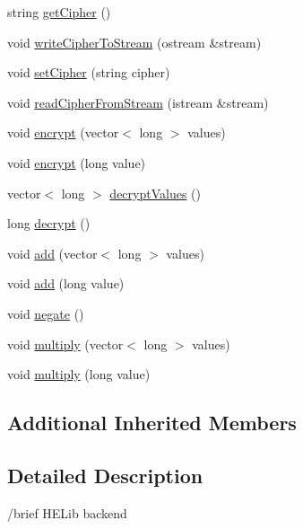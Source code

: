 \begin{DoxyCompactItemize}
\item 
string \hyperlink{classhomomorphine_1_1_h_e_lib_backend_a9ba4311289e3b8c47f389f4f44de7d5d}{get\+Cipher} ()
\item 
void \hyperlink{classhomomorphine_1_1_h_e_lib_backend_a3ec7bec3476ac21921f518ba7a3ff6b2}{write\+Cipher\+To\+Stream} (ostream \&stream)
\item 
void \hyperlink{classhomomorphine_1_1_h_e_lib_backend_a5baa6ad05fbb23d27c4ec4bb018a8c64}{set\+Cipher} (string cipher)
\item 
void \hyperlink{classhomomorphine_1_1_h_e_lib_backend_a91b1a5b9baa1031addb9fce1e4a05ec0}{read\+Cipher\+From\+Stream} (istream \&stream)
\item 
void \hyperlink{classhomomorphine_1_1_h_e_lib_backend_ae142417734796968fe66c4b6174d2b8a}{encrypt} (vector$<$ long $>$ values)
\item 
void \hyperlink{classhomomorphine_1_1_h_e_lib_backend_a0fc8b8ad698a9816dde898087b6b5c57}{encrypt} (long value)
\item 
vector$<$ long $>$ \hyperlink{classhomomorphine_1_1_h_e_lib_backend_a650d87bee6056a404f8ab81ec0f84980}{decrypt\+Values} ()
\item 
long \hyperlink{classhomomorphine_1_1_h_e_lib_backend_a2cd3ebc5a3332100e6cb24480262c395}{decrypt} ()
\item 
void \hyperlink{classhomomorphine_1_1_h_e_lib_backend_a1e3c4745d7efdaac1f75c5a7fbfc3707}{add} (vector$<$ long $>$ values)
\item 
void \hyperlink{classhomomorphine_1_1_h_e_lib_backend_a6cc00dcfc209206e67c7237934cb8d82}{add} (long value)
\item 
void \hyperlink{classhomomorphine_1_1_h_e_lib_backend_acb1ed456fa91fc1dfe878abb068f3f34}{negate} ()
\item 
void \hyperlink{classhomomorphine_1_1_h_e_lib_backend_a05b508bcc4a165d045ebc09f190c5a95}{multiply} (vector$<$ long $>$ values)
\item 
void \hyperlink{classhomomorphine_1_1_h_e_lib_backend_a49d4e073eecc4759f12f60188a533835}{multiply} (long value)
\end{DoxyCompactItemize}
\subsection*{Additional Inherited Members}


\subsection{Detailed Description}
/brief H\+E\+Lib backend


